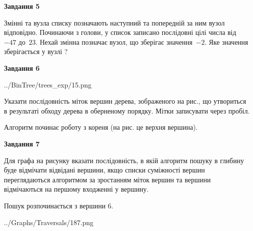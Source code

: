 \documentclass[12pt, ukrainian]{article}
\begin{document}
{\begin {large}
{\begin {center}\textbf{Завдання 5}\end {center}}\par
Змінні  та  вузла списку позначають наступний та попередній за ним вузол відповідно. Починаючи з голови, у список записано послідовні цілі числа від~$-47$ до~$23$. Нехай змінна  позначає вузол, що зберігає значення~$-2$.
Яке значення зберігається у вузлі  ?\par
\newpage

{\begin {center}\textbf{Завдання 6}\end {center}}\par

\begin{center}
	{../BinTree/trees_exp/15.png}
\end{center}
Указати послідовність міток вершин дерева, зображеного на рис., що утвориться в результаті обходу дерева в оберненому порядку. Мітки записувати через пробіл.\par Алгоритм починає роботу з кореня (на рис. це верхня вершина).\par
\newpage

{\begin {center}\textbf{Завдання 7}\end {center}}\par
Для графа на рисунку вказати послідовність, в якій алгоритм пошуку в глибину буде відмічати відвідані вершини, якщо списки суміжності вершин переглядаються алгоритмом за зростанням міток вершин та вершини відмічаються на першому вход\-женні у вершину.\par
Пошук розпочинається з вершини 6.\par

\begin{center}
	{../Graphs/Traversals/187.png}
\end{center}\par
\newpage


\end{large}}
\end{document}
